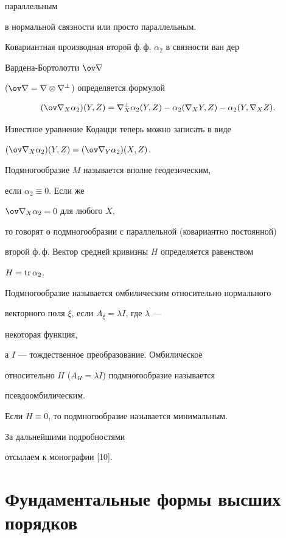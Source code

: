 параллельным


в нормальной связности или просто параллельным.





Ковариантная производная второй ф.\,ф. $\alpha_2$ в связности ван дер


Вардена-Бортолотти $\ov\nabla$


($\ov\nabla=\nabla\otimes\nabla^\bot$) определяется формулой


$$


(\ov\nabla_X\alpha_2)(Y,Z)=\nabla^\bot_X\alpha_2(Y,Z)-


\alpha_2(\nabla_X Y,Z)-\alpha_2(Y,\nabla_X Z).


$$


Известное уравнение Кодацци теперь можно записать в виде


$(\ov\nabla_X\alpha_2)(Y,Z)=(\ov\nabla_Y\alpha_2)(X,Z)$.


Подмногообразие $M$ называется вполне геодезическим,


если $\alpha_2\equiv 0$. Если же


$\ov\nabla_X\alpha_2=0$ для любого $X$,


то говорят о подмногообразии с параллельной (ковариантно постоянной)


второй ф.\,ф. Вектор средней кривизны $H$ определяется равенством


$H=\operatorname{tr}\alpha_2$.





Подмногообразие называется омбилическим относительно нормального


векторного поля $\xi$, если $A_\xi=\lambda I$, где $\lambda$ ---


некоторая функция,


а $I$ --- тождественное преобразование. Омбилическое


относительно $H$ ($A_H=\lambda I$) подмногообразие называется


псевдоомбилическим.


Если $H\equiv 0$, то подмногообразие называется минимальным.





За дальнейшими подробностями


отсылаем к монографии [10].





\section{Фундаментальные формы высших порядков}





